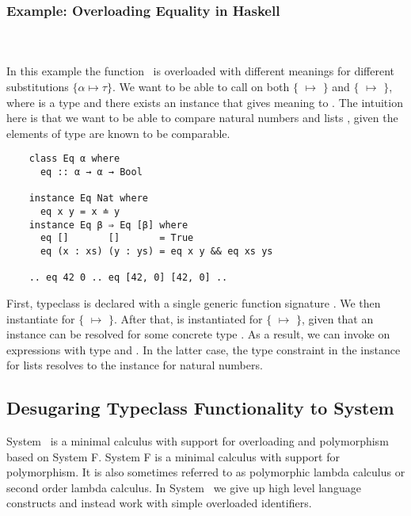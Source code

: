 \subsubsection{Example: Overloading Equality in Haskell}\hfill\\\\
In this example the function \ is overloaded with different meanings for different substitutions $\{α \mapsto τ\}$. 
We want to be able to call  on both $\{$ $\mapsto$ $\}$ and $\{$ $\mapsto$ \inl{[β]}$\}$, where  is a type and there exists an instance that gives meaning to . The intuition here is that we want to be able to compare natural numbers  and lists \mono{[β]}, given the elements of type  are known to be comparable.
\newpage
\begin{verbatim}
    class Eq α where
      eq :: α → α → Bool 

    instance Eq Nat where
      eq x y = x ≐ y
    instance Eq β ⇒ Eq [β] where
      eq []       []       = True
      eq (x : xs) (y : ys) = eq x y && eq xs ys 

    .. eq 42 0 .. eq [42, 0] [42, 0] ..
\end{verbatim}
First, typeclass  is declared with a single generic function signature . 
We then instantiate  for $\{$ $\mapsto$ $\}$. 
After that,   is instantiated for $\{$ $\mapsto$ \inl{[β]}$\}$, given that an instance  can be resolved for some concrete type .
As a result, we can invoke  on expressions with type  and \inl{[Nat]}. 
In the latter case, the type constraint  in the instance for lists resolves to the instance for natural numbers.

\subsection{Desugaring Typeclass Functionality to System \Fo}
System \Fo\ is a minimal calculus with support for overloading and polymorphism based on System F. System F is a minimal calculus with support for polymorphism. It is also sometimes referred to as polymorphic lambda calculus or second order lambda calculus.
In System \Fo\ we give up high level language constructs and instead work with simple overloaded identifiers. 

